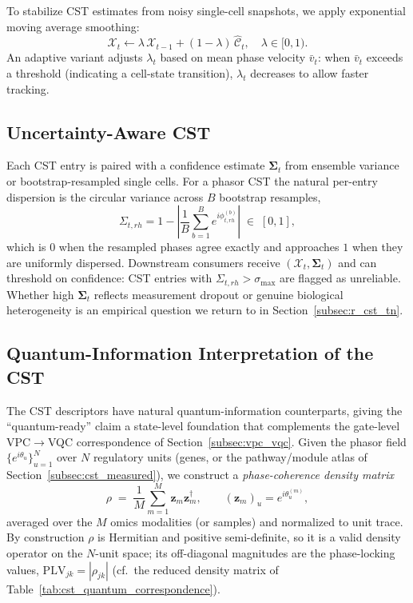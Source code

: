 \documentclass[preprint,12pt,amsmath,amssymb,superscriptaddress,floatfix]{revtex4-2}
\begin{document}
To stabilize CST estimates from noisy single-cell snapshots, we apply
exponential moving average smoothing:
\begin{equation}
    \mathcal{X}_t \leftarrow \lambda\,\mathcal{X}_{t-1}
    + (1-\lambda)\,\widehat{\mathcal{C}}_t, \quad \lambda \in [0,1).
    \label{eq:cst_ema}
\end{equation}
An adaptive variant adjusts $\lambda_t$ based on mean phase velocity
$\bar{v}_t$: when $\bar{v}_t$ exceeds a threshold (indicating a
cell-state transition), $\lambda_t$ decreases to allow faster tracking.

\subsection{Uncertainty-Aware CST}

Each CST entry is paired with a confidence estimate
$\boldsymbol{\Sigma}_t$ from ensemble variance or bootstrap-resampled
single cells.  For a phasor CST the natural per-entry dispersion is the
circular variance across $B$ bootstrap resamples,
\begin{equation}
    \Sigma_{t,rh} = 1 - \left|\frac{1}{B}\sum_{b=1}^{B}
    e^{i\phi^{(b)}_{t,rh}}\right| \;\in\; [0,1],
    \label{eq:cst_uncertainty}
\end{equation}
which is $0$ when the resampled phases agree exactly and approaches $1$ when
they are uniformly dispersed. Downstream consumers receive
$(\mathcal{X}_t, \boldsymbol{\Sigma}_t)$ and can threshold on
confidence: CST entries with $\Sigma_{t,rh} > \sigma_{\max}$ are
flagged as unreliable. Whether high $\boldsymbol{\Sigma}_t$ reflects
measurement dropout or genuine biological heterogeneity is an empirical
question we return to in Section~\ref{subsec:r_cst_tn}.

\subsection{Quantum-Information Interpretation of the CST}
\label{subsec:cst_quantum}

The CST descriptors have natural quantum-information counterparts, giving the
``quantum-ready'' claim a state-level foundation that complements the gate-level
VPC$\to$VQC correspondence of Section~\ref{subsec:vpc_vqc}. Given the phasor
field $\{e^{i\theta_{u}}\}_{u=1}^N$ over $N$ regulatory units (genes, or the
pathway/module atlas of Section~\ref{subsec:cst_measured}), we construct a
\emph{phase-coherence density matrix}
\begin{equation}
  \rho \;=\; \frac{1}{M}\sum_{m=1}^{M} \boldsymbol{z}_m \boldsymbol{z}_m^{\dagger},
  \qquad (\boldsymbol{z}_m)_u = e^{i\theta_{u}^{(m)}},
  \label{eq:cst_density_matrix}
\end{equation}
averaged over the $M$ omics modalities (or samples) and normalized to unit
trace. By construction $\rho$ is Hermitian and positive semi-definite, so it is
a valid density operator on the $N$-unit space; its off-diagonal magnitudes are
the phase-locking values, $\mathrm{PLV}_{jk}=|\rho_{jk}|$ (cf.\ the reduced
density matrix of Table~\ref{tab:cst_quantum_correspondence}).
\end{document}
